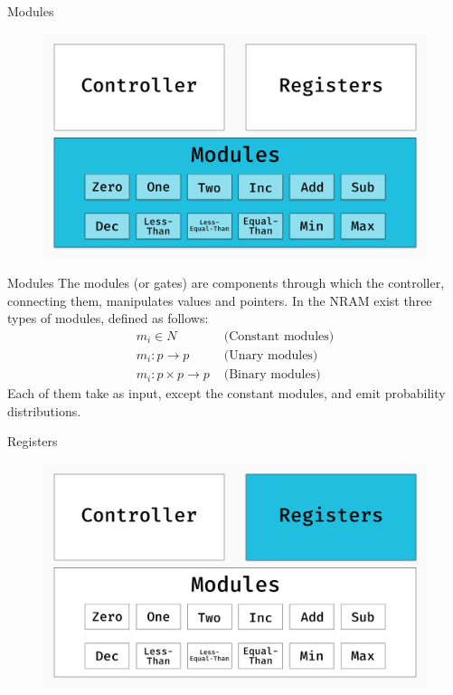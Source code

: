 \documentclass{beamer}
\begin{document}
  \begin{frame}{Modules}
  	\begin{figure}
  		\centering
  		\includegraphics[width=\textwidth]{../figures/schema-nram-without-memory-MS.png}
  	\end{figure}
  \end{frame}
  \begin{frame}{Modules}
  	The modules (or gates) are components through which the controller, connecting them, manipulates values and pointers. In the NRAM exist three types of modules, defined as follows:
  	\begin{align}
		m_i \in N & \textrm{ (Constant modules)} \\
		m_i: p \rightarrow p & \textrm{ (Unary modules)} \\
		m_i: p \times p \rightarrow p & \textrm{ (Binary modules)}
	\end{align}
	Each of them take as input, except the constant modules, and emit probability distributions.
  \end{frame}
  \begin{frame}{Registers}
  	\begin{figure}
  		\centering
  		\includegraphics[width=\textwidth]{../figures/schema-nram-without-memory-RS.png}
  	\end{figure}
  \end{frame}
\end{document}
